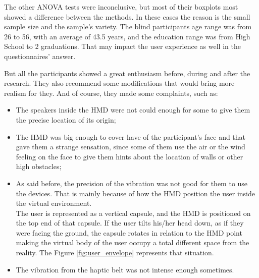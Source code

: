 The other ANOVA tests were inconclusive, but most of their boxplots most showed a difference between the methods. In these cases the reason is the small sample size and the sample’s variety. The blind participants age range was from 26 to 56, with an average of 43.5 years, and the education range was from High School to 2 graduations. That may impact the user experience as well in the questionnaires' answer.

But all the participants showed a great enthusiasm before, during and after the research. They also recommend some modifications that would bring more realism for they. And of course, they made some complaints, such as:

\begin{itemize}
    \item The speakers inside the HMD were not could enough for some to give them the precise location of its origin;
    \item The HMD was big enough to cover have of the participant’s face and that gave them a strange sensation, since some of them use the air or the wind feeling on the face to give them hints about the location of walls or other high obstacles;
    \item As said before, the precision of the vibration was not good for them to use the devices. That is mainly because of how the HMD position the user inside the virtual environment. \\
    The user is represented as a vertical capsule, and the HMD is positioned on the top end of that capsule. If the user tilts his/her head down, as if they were facing the ground, the capsule rotates in relation to the HMD point making the virtual body of the user occupy a total different space from the reality. The Figure \ref{fig:user_envelope} represents that situation. 

    
    \item The vibration from the haptic belt was not intense enough sometimes.
\end{itemize}

